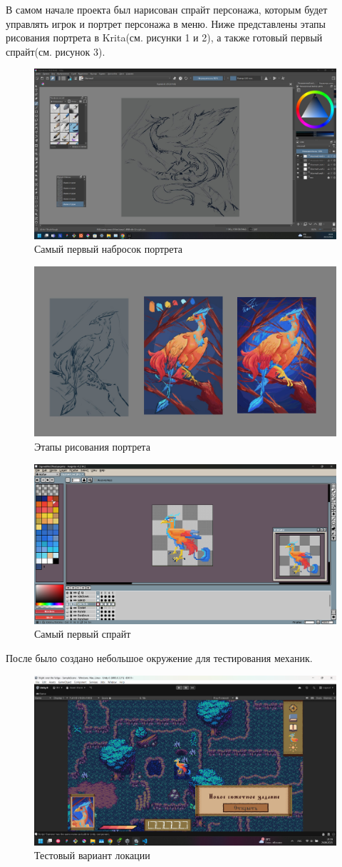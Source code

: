 \documentclass[bachelor, och, coursework, times]{SCWorks}
\begin{document}
    В самом начале проекта был нарисован спрайт персонажа, которым 
    будет управлять игрок и портрет персонажа в меню. Ниже представлены этапы рисования портрета
    в Krita(см. рисунки 1 и 2), а также готовый первый спрайт(см. рисунок 3).

    \begin{figure} [H]
        \centering
    \includegraphics[width=0.50\linewidth]{Pictures/429b39b3-0e5e-4c1a-8a76-12356a091a6b.jpg}
    \caption{Самый первый набросок портрета}
    \label{fig:first}
    \end{figure}

    \begin{figure} [H]
        \centering
    \includegraphics[width=0.50\linewidth]{Pictures/Procces.png}
    \caption{Этапы рисования портрета}
    \label{fig:process}
    \end{figure}

     \begin{figure} [H]
        \centering
    \includegraphics[width=0.50\linewidth]{Pictures/Снимок экрана 2025-06-24 162217.png}
    \caption{Самый первый спрайт}
    \label{fig:Acep}
    \end{figure}

    После было создано небольшое окружение для тестирования механик. 

     \begin{figure} [H]
        \centering
    \includegraphics[width=0.50\linewidth]{Pictures/Снимок экрана 2025-06-24 211929.png}
    \caption{Тестовый вариант локации}
    \label{fig:Beginning}
    \end{figure}
\end{document}
